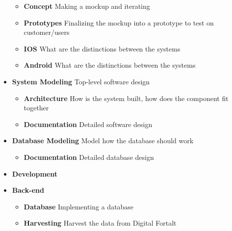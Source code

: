 \begin{appendices}
\begin{itemize}
			\begin{itemize}
				\item \textbf{Concept} \newline
				Making a mockup and iterating
				
				\item \textbf{Prototypes} \newline
				Finalizing the mockup into a prototype to test on customer/users
				
				\item \textbf{IOS} \newline
				What are the distinctions between the systems
				\item \textbf{Android} \newline
				What are the distinctions between the systems
			\end{itemize}
			\item \textbf{System Modeling} \newline
			Top-level software design
			
			\begin{itemize}
				\item \textbf{Architecture} \newline
				How is the system built, how does the component fit together
				\item \textbf{Documentation} \newline
				Detailed software design
				
			\end{itemize}
			\item \textbf{Database Modeling} \newline
			Model how the database should work
			\begin{itemize}
				\item \textbf{Documentation} \newline
				Detailed database design
			\end{itemize}
	\item \textbf{Development}
			\item \textbf{Back-end} \newline
			\begin{itemize}
				\item \textbf{Database} \newline
				Implementing a database
				\item \textbf{Harvesting} \newline
				Harvest the data from Digital Fortalt
				

\end{itemize}
\end{itemize}
\end{appendices}
